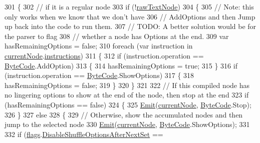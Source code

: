 \begin{DoxyCode}
301         \{
302             \textcolor{comment}{// if it is a regular node}
303             \textcolor{keywordflow}{if} (!\hyperlink{a00051_af6afc8ccb59931650919b863d62d52a4}{rawTextNode})
304             \{
305                 \textcolor{comment}{// Note: this only works when we know that we don't have}
306                 \textcolor{comment}{// AddOptions and then Jump up back into the code to run them.}
307                 \textcolor{comment}{// TODO: A better solution would be for the parser to flag}
308                 \textcolor{comment}{// whether a node has Options at the end.}
309                 var hasRemainingOptions = \textcolor{keyword}{false};
310                 \textcolor{keywordflow}{foreach} (var instruction \textcolor{keywordflow}{in} \hyperlink{a00051_a7384f3d524959a489d51a0a9e1f0477d}{currentNode}.\hyperlink{a00048_a156723a9252b62d288ddf611939ea7c3}{instructions})
311                 \{
312                     \textcolor{keywordflow}{if} (instruction.operation == \hyperlink{a00048_ad5dfb6ee68ca7469623ad3e459f98894}{ByteCode}.AddOption)
313                     \{
314                         hasRemainingOptions = \textcolor{keyword}{true};
315                     \}
316                     \textcolor{keywordflow}{if} (instruction.operation == \hyperlink{a00048_ad5dfb6ee68ca7469623ad3e459f98894}{ByteCode}.ShowOptions)
317                     \{
318                         hasRemainingOptions = \textcolor{keyword}{false};
319                     \}
320                 \}
321 
322                 \textcolor{comment}{// If this compiled node has no lingering options to show at the end of the node, then stop
       at the end}
323                 \textcolor{keywordflow}{if} (hasRemainingOptions == \textcolor{keyword}{false})
324                 \{
325                     \hyperlink{a00051_a774e8c143cdda0584fcfdda98626a83c}{Emit}(\hyperlink{a00051_a7384f3d524959a489d51a0a9e1f0477d}{currentNode}, \hyperlink{a00048_ad5dfb6ee68ca7469623ad3e459f98894}{ByteCode}.Stop);
326                 \}
327                 \textcolor{keywordflow}{else}
328                 \{
329                     \textcolor{comment}{// Otherwise, show the accumulated nodes and then jump to the selected node}
330                     \hyperlink{a00051_a774e8c143cdda0584fcfdda98626a83c}{Emit}(\hyperlink{a00051_a7384f3d524959a489d51a0a9e1f0477d}{currentNode}, \hyperlink{a00048_ad5dfb6ee68ca7469623ad3e459f98894}{ByteCode}.ShowOptions);
331 
332                     \textcolor{keywordflow}{if} (\hyperlink{a00051_a541022d89bcf9bc8f794eb6d6b438d08}{flags}.\hyperlink{a00051_a8b49bb7763ff477cba21d7c771ef3ed0}{DisableShuffleOptionsAfterNextSet} == \textcolor{keyword}{
}
\end{DoxyCode}
